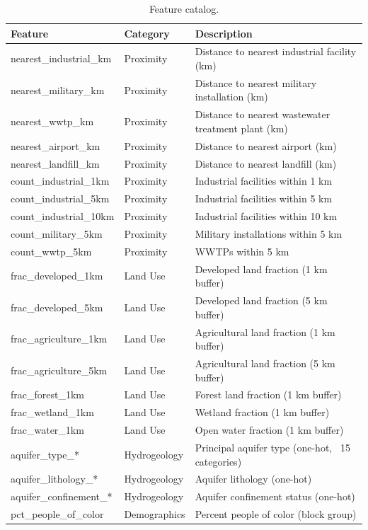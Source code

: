 \begin{table}
\caption{Feature catalog.}
\label{tab:ext_features}
\begin{tabular}{lll}
\toprule
Feature & Category & Description \\
\midrule
nearest_industrial_km & Proximity & Distance to nearest industrial facility (km) \\
nearest_military_km & Proximity & Distance to nearest military installation (km) \\
nearest_wwtp_km & Proximity & Distance to nearest wastewater treatment plant (km) \\
nearest_airport_km & Proximity & Distance to nearest airport (km) \\
nearest_landfill_km & Proximity & Distance to nearest landfill (km) \\
count_industrial_1km & Proximity & Industrial facilities within 1 km \\
count_industrial_5km & Proximity & Industrial facilities within 5 km \\
count_industrial_10km & Proximity & Industrial facilities within 10 km \\
count_military_5km & Proximity & Military installations within 5 km \\
count_wwtp_5km & Proximity & WWTPs within 5 km \\
frac_developed_1km & Land Use & Developed land fraction (1 km buffer) \\
frac_developed_5km & Land Use & Developed land fraction (5 km buffer) \\
frac_agriculture_1km & Land Use & Agricultural land fraction (1 km buffer) \\
frac_agriculture_5km & Land Use & Agricultural land fraction (5 km buffer) \\
frac_forest_1km & Land Use & Forest land fraction (1 km buffer) \\
frac_wetland_1km & Land Use & Wetland fraction (1 km buffer) \\
frac_water_1km & Land Use & Open water fraction (1 km buffer) \\
aquifer_type_* & Hydrogeology & Principal aquifer type (one-hot, ~15 categories) \\
aquifer_lithology_* & Hydrogeology & Aquifer lithology (one-hot) \\
aquifer_confinement_* & Hydrogeology & Aquifer confinement status (one-hot) \\
pct_people_of_color & Demographics & Percent people of color (block group) \\

\end{tabular}
\end{table}
